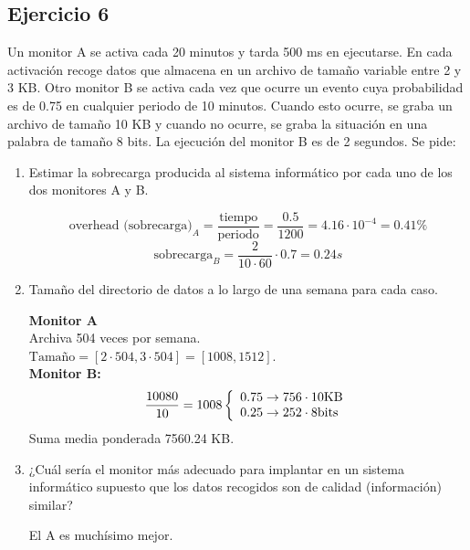 \subsection{Ejercicio 6}
\noindent
Un monitor A se activa cada 20 minutos y tarda 500 ms en ejecutarse. En cada activación recoge datos que almacena en un archivo de tamaño variable entre 2 y 3 KB. Otro monitor B se activa cada vez que ocurre un evento cuya probabilidad es de 0.75 en cualquier periodo de 10 minutos. Cuando esto ocurre, se graba un archivo de tamaño 10 KB y cuando no ocurre, se graba la situación en una palabra de tamaño 8 bits. La ejecución del monitor B es de 2 segundos. Se pide:
\begin{enumerate}
    \item Estimar la sobrecarga producida al sistema informático por cada uno de los dos monitores A y B.
\begin{tcolorbox}[colback=white,colframe=cyan!50!black,fonttitle=\bfseries]
\[
\text{overhead (sobrecarga)}_A=\dfrac{\text{tiempo}}{\text{periodo}}=\dfrac{0.5}{1200}=4.16\cdot 10^{-4}=0.41\%
\]
\[
\text{sobrecarga}_B=\dfrac{2}{10\cdot 60}\cdot 0.7=0.24s
\]
\end{tcolorbox}    
    \item Tamaño del directorio de datos a lo largo de una semana para cada caso.
\begin{tcolorbox}[colback=white,colframe=cyan!50!black,fonttitle=\bfseries]
\textbf{Monitor A}\\
Archiva 504 veces por semana.\\
$\text{Tamaño}=[2\cdot 504,3\cdot 504]=[1008,1512]$.\\

\textbf{Monitor B:}
\[
\dfrac{10080}{10}=1008\left\lbrace\begin{array}{ll}
0.75\rightarrow 756\cdot 10\text{KB}\\
0.25\rightarrow 252\cdot 8\text{bits}
\end{array}\right.
\]
\quad \quad \quad \quad Suma media ponderada 7560.24 KB.
\end{tcolorbox}    
    \item ¿Cuál sería el monitor más adecuado para implantar en un sistema informático supuesto que los datos recogidos son de calidad (información) similar?
\begin{tcolorbox}[colback=white,colframe=cyan!50!black,fonttitle=\bfseries]
El A es muchísimo mejor.
\end{tcolorbox}    
\end{enumerate}

